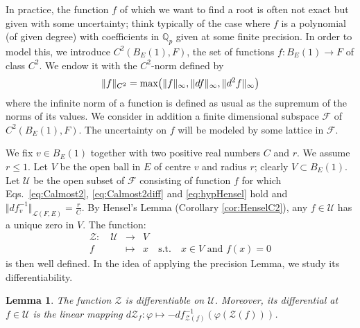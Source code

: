 \documentclass[11pt]{article}
\numberwithin{equation}{section}
\numberwithin{figure}{section}
\renewcommand{\leq}{\leqslant}
\newtheorem{lem}[theo]{Lemma}
\theoremstyle{definition}
\newcommand{\Q}{\mathbb Q}
\newcommand{\Qp}{\Q_p}
\newcommand{\calF}{\mathcal F}
\newcommand{\calL}{\mathcal L}
\newcommand{\calU}{\mathcal U}
\newcommand{\calZ}{\mathcal Z}
\renewcommand{\max}{\text{\rm max}}
\begin{document}
In practice, the function $f$ of which we want to find a root is often 
not exact but given with some uncertainty; think typically of the case
where $f$ is a polynomial (of given degree) with coefficients in $\Qp$
given at some finite precision.
In order to model this, we introduce $C^2(B_E(1),F)$, the set 
of functions $f : B_E(1) \to F$ of class $C^2$. We endow it with the
$C^2$-norm defined by
$$\Vert f \Vert_{C^2} = \max \big( 
\Vert f \Vert_\infty,
\Vert df \Vert_\infty,
\Vert d^2f \Vert_\infty\big)$$
where the infinite norm of a function is defined as usual as the
supremum of the norms of its values.
We consider in addition a finite dimensional subspace $\calF$ of 
$C^2(B_E(1),F)$. The uncertainty on $f$ will be modeled by some lattice 
in $\calF$.

We fix $v \in B_E(1)$ together with two positive real numbers $C$ and 
$r$. We assume $r \leq 1$. Let $V$ be the open ball in $E$ of centre $v$ 
and radius $r$; clearly $V \subset B_E(1)$.
Let $\calU$ be the open subset of $\calF$ consisting of function $f$
for which Eqs.~\eqref{eq:Calmost2}, \eqref{eq:Calmost2diff} and 
\eqref{eq:hypHensel} hold and $\Vert df_v^{-1} \Vert_{\calL(F,E)}
= \frac r C$. By Hensel's Lemma (Corollary \ref{cor:HenselC2}), any
$f \in \calU$ has a unique zero in $V$. The function:
$$\begin{array}{rcl}
\calZ : \quad \calU & \longrightarrow & V \\
f & \mapsto & x \quad \text{s.t.} \quad x\in V \text{ and } f(x) = 0
\end{array}$$
is then well defined. In the idea of applying the precision Lemma, we
study its differentiability.

\begin{lem}
\label{lem:diffZ}
The function $\calZ$ is differentiable on $\calU$. 
Moreover, its differential at $f \in \calU$ is the linear mapping 
$d\calZ_f : \varphi \mapsto - df_{\calZ(f)}^{-1}(\varphi(\calZ(f)))$.
\end{lem}
\end{document}
